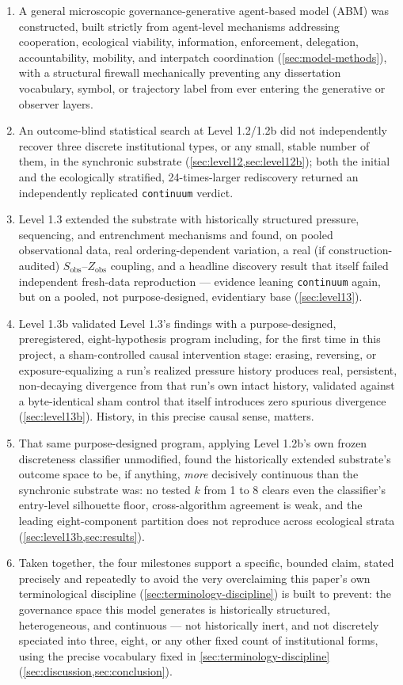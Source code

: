 \begin{enumerate}
\item A general microscopic governance-generative agent-based model (ABM)
  was constructed, built strictly from agent-level mechanisms addressing
  cooperation, ecological viability, information, enforcement, delegation,
  accountability, mobility, and interpatch coordination
  (\cref{sec:model-methods}), with a structural firewall mechanically
  preventing any dissertation vocabulary, symbol, or trajectory label from
  ever entering the generative or observer layers.
\item An outcome-blind statistical search at Level 1.2/1.2b did not
  independently recover three discrete institutional types, or any small,
  stable number of them, in the synchronic substrate
  (\cref{sec:level12,sec:level12b}); both the initial and the ecologically
  stratified, 24-times-larger rediscovery returned an independently
  replicated \texttt{continuum} verdict.
\item Level 1.3 extended the substrate with historically structured
  pressure, sequencing, and entrenchment mechanisms and found, on pooled
  observational data, real ordering-dependent variation, a real
  (if construction-audited) $S_{\text{obs}}$--$Z_{\text{obs}}$ coupling, and
  a headline discovery result that itself failed independent fresh-data
  reproduction --- evidence leaning \texttt{continuum} again, but on a
  pooled, not purpose-designed, evidentiary base (\cref{sec:level13}).
\item Level 1.3b validated Level 1.3's findings with a purpose-designed,
  preregistered, eight-hypothesis program including, for the first time in
  this project, a sham-controlled causal intervention stage: erasing,
  reversing, or exposure-equalizing a run's realized pressure history
  produces real, persistent, non-decaying divergence from that run's own
  intact history, validated against a byte-identical sham control that
  itself introduces zero spurious divergence (\cref{sec:level13b}). History,
  in this precise causal sense, matters.
\item That same purpose-designed program, applying Level 1.2b's own frozen
  discreteness classifier unmodified, found the historically extended
  substrate's outcome space to be, if anything, \textit{more} decisively
  continuous than the synchronic substrate was: no tested $k$ from 1 to 8
  clears even the classifier's entry-level silhouette floor, cross-algorithm
  agreement is weak, and the leading eight-component partition does not
  reproduce across ecological strata (\cref{sec:level13b,sec:results}).
\item Taken together, the four milestones support a specific, bounded
  claim, stated precisely and repeatedly to avoid the very overclaiming this
  paper's own terminological discipline (\cref{sec:terminology-discipline}) is
  built to prevent: the governance space this model generates is
  historically structured, heterogeneous, and continuous --- not
  historically inert, and not discretely speciated into three, eight, or
  any other fixed count of institutional forms, using the precise
  vocabulary fixed in \cref{sec:terminology-discipline}
  (\cref{sec:discussion,sec:conclusion}).
\end{enumerate}

